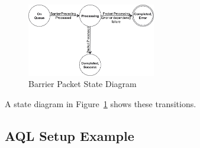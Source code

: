 \begin{figure}
  \centering
  \includegraphics[width=0.5\textwidth] {barrierpacketstate}
  \centering
  \caption{Barrier Packet State Diagram}
  \label{fig:barrierpacketstate}
\end{figure}

A state diagram in Figure~\ref{fig:barrierpacketstate} shows these
transitions.

\hypertarget{aql_example}{}\subsection{AQL Setup
Example}\label{aql_example}


